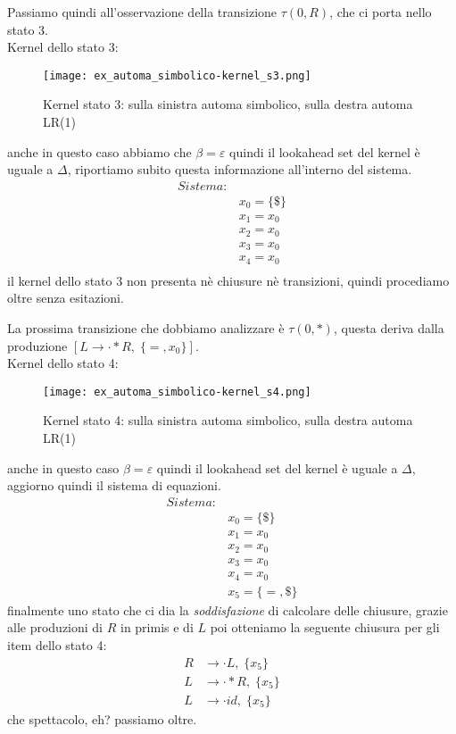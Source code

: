 \documentclass[class=book, crop=false, oneside, 12pt]{standalone}
\begin{document}
Passiamo quindi all'osservazione della transizione \(\tau(0,R)\), che ci porta nello stato 3.
\\
Kernel dello stato 3:
\begin{figure}[h!]
    \centering
    \texttt{[image: ex\_automa\_simbolico-kernel\_s3.png]}
    \caption{Kernel stato 3: sulla sinistra automa simbolico, sulla destra automa LR(1)}
\end{figure}
anche in questo caso abbiamo che \(\beta = \varepsilon\) quindi il lookahead set del kernel è uguale a \(\Delta\), riportiamo subito questa informazione all'interno del sistema.
\begin{align*}
    Sistema:& \\
            & x_0 = \{\$\} \\
            & x_1 = x_0 \\
            & x_2 = x_0 \\
            & x_3 = x_0 \\
            & x_4 = x_0 \\
\end{align*}
il kernel dello stato 3 non presenta nè chiusure nè transizioni, quindi procediamo oltre senza esitazioni.

La prossima transizione che dobbiamo analizzare è \(\tau(0,*)\), questa deriva dalla produzione \([L \to \cdot *R, \; \{=, x_0\}]\).
\\
Kernel dello stato 4:
\begin{figure}[h!]
    \centering
    \texttt{[image: ex\_automa\_simbolico-kernel\_s4.png]}
    \caption{Kernel stato 4: sulla sinistra automa simbolico, sulla destra automa LR(1)}
\end{figure}
anche in questo caso  \(\beta = \varepsilon\) quindi il lookahead set del kernel è uguale a \(\Delta\), aggiorno quindi il sistema di equazioni.
\begin{align*}
    Sistema:& \\
            & x_0 = \{\$\} \\
            & x_1 = x_0 \\
            & x_2 = x_0 \\
            & x_3 = x_0 \\
            & x_4 = x_0 \\
            & x_5 = \{=, \$\}
\end{align*}
finalmente uno stato che ci dia la \emph{soddisfazione} di calcolare delle chiusure, grazie alle produzioni di \(R\) in primis e di \(L\) poi otteniamo la seguente chiusura per gli item dello stato 4:
\begin{align*}
    R &\to \cdot L, \; \{x_5\} \\
    L &\to \cdot *R, \; \{x_5\} \\
    L &\to \cdot id, \; \{x_5\}
\end{align*}
che spettacolo, eh? passiamo oltre.
\end{document}

